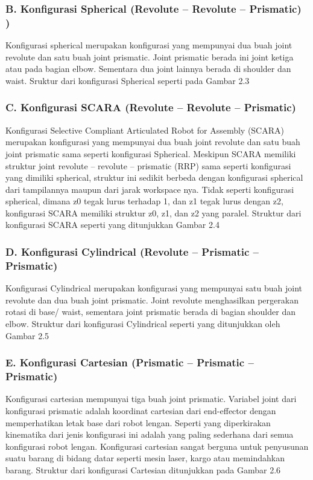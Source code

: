 \subsubsection{B. Konfigurasi Spherical (Revolute – Revolute – Prismatic)   )} 

Konfigurasi spherical merupakan konfigurasi yang mempunyai dua buah joint revolute dan satu buah joint prismatic. Joint prismatic berada ini joint ketiga atau pada bagian elbow. Sementara dua joint lainnya berada di shoulder dan waist. Sruktur dari konfigurasi Spherical seperti pada Gambar 2.3

\subsubsection{C. Konfigurasi SCARA (Revolute – Revolute – Prismatic) } 

Konfigurasi Selective Compliant Articulated Robot for Assembly (SCARA) merupakan konfigurasi yang mempunyai dua buah joint revolute dan satu buah joint prismatic sama seperti konfigurasi Spherical. Meskipun SCARA memiliki struktur joint revolute – revolute – prismatic (RRP) sama seperti konfigurasi yang dimiliki spherical, struktur ini sedikit berbeda dengan konfigurasi spherical dari tampilannya maupun dari jarak workspace nya. Tidak seperti konfigurasi spherical, dimana z0 tegak lurus terhadap 1, dan z1 tegak lurus dengan z2, konfigurasi SCARA memiliki struktur z0, z1, dan z2 yang paralel. Struktur dari konfigurasi SCARA seperti yang ditunjukkan Gambar 2.4

\subsubsection{D. Konfigurasi Cylindrical (Revolute – Prismatic – Prismatic) } 

Konfigurasi Cylindrical merupakan konfigurasi yang mempunyai satu buah joint revolute dan dua buah joint prismatic. Joint revolute menghasilkan pergerakan rotasi di base/ waist, sementara joint prismatic berada di bagian shoulder dan elbow. Struktur dari konfigurasi Cylindrical seperti yang ditunjukkan oleh Gambar 2.5

\subsubsection{E. Konfigurasi Cartesian (Prismatic – Prismatic – Prismatic)  } 

Konfigurasi cartesian mempunyai tiga buah joint prismatic. Variabel joint dari konfigurasi prismatic adalah koordinat cartesian dari end-effector dengan memperhatikan letak base dari robot lengan. Seperti yang diperkirakan kinematika dari jenis konfigurasi ini adalah yang paling sederhana dari semua konfigurasi robot lengan. Konfigurasi cartesian sangat berguna untuk penyusunan suatu barang di bidang datar seperti mesin laser, kargo atau memindahkan barang. Struktur dari konfigurasi Cartesian ditunjukkan pada Gambar 2.6


